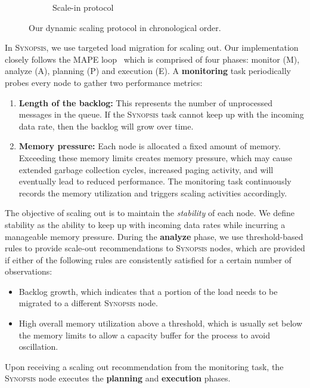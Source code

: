 \begin{figure}[h!]
\begin{subfigure}{0.45\textwidth}
                \caption{Scale-in protocol}
                \label{fig:scale-in-protocol}
        \end{subfigure}
        \caption{Our dynamic scaling protocol in chronological order.}
        \label{fig:dynamic-scaling-protocols}
\end{figure}

In \textsc{Synopsis}, we use targeted load migration for scaling out.
Our implementation closely follows the MAPE loop~\cite{maurer2011revealing} which is comprised of four phases: monitor (M), analyze (A), planning (P) and execution (E).
A \textbf{monitoring} task periodically probes every node to gather two performance metrics:
\begin{enumerate}[leftmargin=*]
	\item \textbf{Length of the backlog:} This represents the number of unprocessed messages in the queue. If the \textsc{Synopsis} task cannot keep up with the incoming data rate, then the backlog will grow over time.
	\item \textbf{Memory pressure:} Each node is allocated a fixed amount of memory. 
	Exceeding these memory limits creates memory pressure, which may cause extended garbage collection cycles, increased paging activity, and will eventually lead to reduced performance.
	The monitoring task continuously records the memory utilization and triggers scaling activities accordingly.
\end{enumerate} 

The objective of scaling out is to maintain the \emph{stability} of each node.
We define stability as the ability to keep up with incoming data rates while incurring a manageable memory pressure.  During the \textbf{analyze} phase, we use threshold-based rules \cite{lorido2012auto} to provide scale-out recommendations to \textsc{Synopsis} nodes, which are provided if either of the following rules are consistently satisfied for a certain number of observations:
\begin{itemize}[leftmargin=*]  
\item Backlog growth, which indicates that a portion of the load needs to be migrated to a different \textsc{Synopsis} node.
\item High overall memory utilization above a threshold, which is usually set below the memory limits to allow a capacity buffer for the process to avoid oscillation.
\end{itemize}
Upon receiving a scaling out recommendation from the monitoring task, the \textsc{Synopsis} node executes the \textbf{planning} and \textbf{execution} phases.


